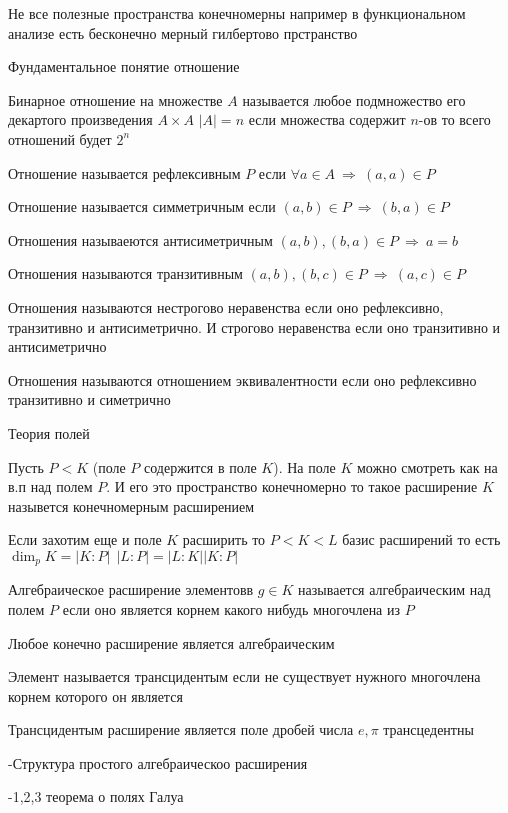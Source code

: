 Не все полезные пространства конечномерны например в функциональном анализе
есть бесконечно мерный гилбертово прстранство

Фундаментальное понятие отношение

Бинарное отношение на множестве $A$ называется любое подмножество его декартого
произведения $A \times A$ $|A| = n$ если множества содержит $n$-ов то всего
отношений будет $2^n$

Отношение называется рефлексивным $P$ если $\forall a \in A ~ \Rightarrow ~
(a,a) \in P$

Отношение называется симметричным если $(a,b) \in P ~ \Rightarrow ~
(b,a) \in P$

Отношения называеются антисиметричным $(a,b), (b,a) \in P ~ \Rightarrow ~ a=b$

Отношения называются транзитивным $(a,b), (b,c) \in P ~ \Rightarrow ~ (a,c) \in
P$

Отношения называются нестрогово неравенства если оно рефлексивно, транзитивно
и антисиметрично. И строгово неравенства если оно транзитивно и антисиметрично

Отношения называются отношением эквивалентности если оно рефлексивно
транзитивно и симетрично

\begin{title}[\large]
  Теория полей
\end{title}

Пусть $P < K$ (поле $P$ содержится в поле $K$). На поле $K$ можно смотреть как
на в.п над полем $P$. И его это пространство конечномерно то такое расширение
$K$ назывется конечномерным расширением

Если захотим еще и поле $K$ расширить то $P<K<L$ базис расширений то есть
$\dim_p K = |K : P| ~~ |L : P| = |L:K||K:P|$

Алгебраическое расширение элементовв $g \in K$ называется алгебраическим над
полем $P$ если оно является корнем какого нибудь многочлена из $P$

\begin{theorem}
  Любое конечно расширение является алгебраическим
\end{theorem}

Элемент называется трансцидентым если не существует нужного многочлена корнем которого он является

Трансцидентым расширение является поле дробей числа $e, \pi$ трансцедентны

-Структура простого алгебраическоо расширения

-1,2,3 теорема о полях Галуа

